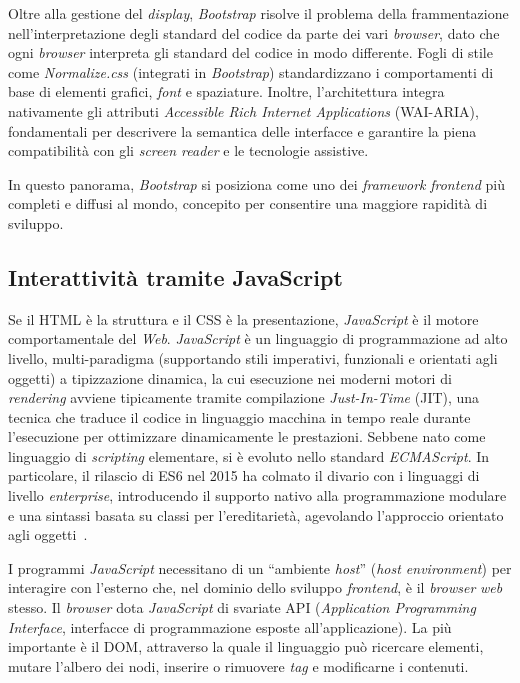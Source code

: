 Oltre alla gestione del \textit{display}, \textit{Bootstrap} risolve il problema della frammentazione nell’interpretazione degli standard del codice da parte dei vari \textit{browser}, dato che ogni \textit{browser} interpreta gli standard del codice in modo differente. Fogli di stile come \textit{Normalize.css} (integrati in \textit{Bootstrap}) standardizzano i comportamenti di base di elementi grafici, \textit{font} e spaziature. Inoltre, l'architettura integra nativamente gli attributi \textit{Accessible Rich Internet Applications} (WAI-ARIA), fondamentali per descrivere la semantica delle interfacce e garantire la piena compatibilità con gli \textit{screen reader} e le tecnologie assistive.

In questo panorama, \textit{Bootstrap} si posiziona come uno dei \textit{framework} \textit{frontend} più completi e diffusi al mondo, concepito per consentire una maggiore rapidità di sviluppo.


\subsection{Interattività tramite JavaScript} 
Se il HTML è la struttura e il CSS è la presentazione, \textit{JavaScript} è il motore comportamentale del \textit{Web}. \textit{JavaScript} è un linguaggio di programmazione ad alto livello, multi-paradigma (supportando stili imperativi, funzionali e orientati agli oggetti) a tipizzazione dinamica, la cui esecuzione nei moderni motori di \textit{rendering} avviene tipicamente tramite compilazione \textit{Just-In-Time} (JIT), una tecnica che traduce il codice in linguaggio macchina in tempo reale durante l'esecuzione per ottimizzare dinamicamente le prestazioni.
Sebbene nato come linguaggio di \textit{scripting} elementare, si è evoluto nello standard \textit{ECMAScript}. In particolare, il rilascio di ES6 nel 2015 ha colmato il divario con i linguaggi di livello \textit{enterprise}, introducendo il supporto nativo alla programmazione modulare e una sintassi basata su classi per l'ereditarietà, agevolando l'approccio orientato agli oggetti~\autocite{ECMA26216thEdition}.

I programmi \textit{JavaScript} necessitano di un ``ambiente \textit{host}'' (\textit{host environment}) per interagire con l’esterno che, nel dominio dello sviluppo \textit{frontend}, è il \textit{browser} \textit{web} stesso. Il \textit{browser} dota \textit{JavaScript} di svariate API (\textit{Application Programming Interface}, interfacce di programmazione esposte all'applicazione). La più importante è il DOM, attraverso la quale il linguaggio può ricercare elementi, mutare l'albero dei nodi, inserire o rimuovere \textit{tag} e modificarne i contenuti.

